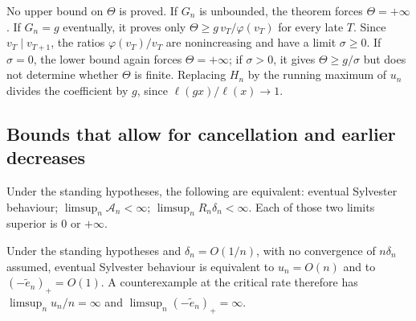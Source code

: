 \documentclass[11pt]{article}
\begin{document}
No upper bound on $\Theta$ is proved. If $G_n$ is unbounded, the theorem
forces $\Theta=+\infty$. If $G_n=g$ eventually, it proves only
$\Theta\ge g\,v_T/\varphi(v_T)$ for every late $T$. Since $v_T\mid v_{T+1}$,
the ratios $\varphi(v_T)/v_T$ are nonincreasing and have a limit
$\sigma\ge0$. If $\sigma=0$, the lower bound again forces
$\Theta=+\infty$; if $\sigma>0$, it gives $\Theta\ge g/\sigma$ but does
not determine whether $\Theta$ is finite. Replacing $H_n$ by the running
maximum of $u_n$ divides the coefficient by $g$, since
$\ell(gx)/\ell(x)\to1$.

\subsection{Bounds that allow for cancellation and earlier decreases}

\begin{theorem}\label{long243:res:recordamplified}
Under the standing hypotheses, the following are equivalent: eventual Sylvester behaviour; $\limsup_n\mathcal A_n<\infty$;
$\limsup_nR_n\delta_n<\infty$.  Each of those two limits superior is $0$ or
$+\infty$.
\end{theorem}

\begin{corollary}\label{long243:res:criticalrate}
Under the standing hypotheses and $\delta_n=O(1/n)$, with no convergence of $n\delta_n$ assumed,
eventual Sylvester behaviour is equivalent to $u_n=O(n)$ and to $(-\tilde e_n)_+=O(1)$.  A
counterexample at the critical rate therefore has $\limsup_nu_n/n=\infty$ and
$\limsup_n(-\tilde e_n)_+=\infty$.
\end{corollary}
\end{document}
